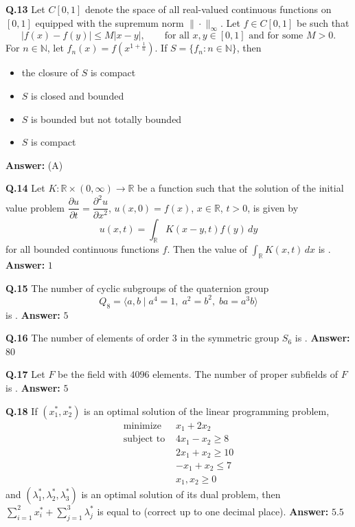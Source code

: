 \documentclass[11pt,a4paper]{article}
\newcommand{\optslistA}[4]{%
  \begin{itemize}
    \setlength{\itemsep}{2pt}\setlength{\parskip}{0pt}
    \item[(A)] #1
    \item[(B)] #2
    \item[(C)] #3
    \item[(D)] #4
  \end{itemize}%
}
\newcommand{\ans}[1]{\textbf{Answer:} #1\par\medskip}
\begin{document}
\textbf{Q.13} Let $C[0, 1]$ denote the space of all real-valued continuous functions on $[0, 1]$ equipped with the supremum norm $\|\cdot\|_\infty$. Let $f \in C[0, 1]$ be such that
\[
  |f(x) - f(y)| \le M |x - y|, \qquad \text{for all } x, y \in [0, 1] \text{ and for some } M > 0.
\]
For $n \in \mathbb{N}$, let $f_n(x) = f\!\left(x^{1 + \frac{1}{n}}\right)$. If $S = \{f_n : n \in \mathbb{N}\}$, then
\optslistA{the closure of $S$ is compact}{$S$ is closed and bounded}{$S$ is bounded but not totally bounded}{$S$ is compact}
\ans{(A)}

\textbf{Q.14} Let $K : \mathbb{R} \times (0, \infty) \to \mathbb{R}$ be a function such that the solution of the initial value problem $\dfrac{\partial u}{\partial t} = \dfrac{\partial^2 u}{\partial x^2}$, $u(x, 0) = f(x)$, $x \in \mathbb{R}$, $t > 0$, is given by
\[
  u(x, t) = \int_{\mathbb{R}} K(x - y, t) f(y)\,dy
\]
for all bounded continuous functions $f$. Then the value of $\displaystyle\int_{\mathbb{R}} K(x, t)\,dx$ is \underline{\hspace{2cm}}.
\ans{$1$}

\textbf{Q.15} The number of cyclic subgroups of the quaternion group
\[
  Q_8 = \langle a, b \mid a^4 = 1,\; a^2 = b^2,\; ba = a^3 b \rangle
\]
is \underline{\hspace{2cm}}.
\ans{$5$}

\textbf{Q.16} The number of elements of order $3$ in the symmetric group $S_6$ is \underline{\hspace{2cm}}.
\ans{$80$}

\textbf{Q.17} Let $F$ be the field with $4096$ elements. The number of proper subfields of $F$ is \underline{\hspace{2cm}}.
\ans{$5$}

\textbf{Q.18} If $(x_1^*, x_2^*)$ is an optimal solution of the linear programming problem,
\begin{align*}
  \text{minimize } & x_1 + 2x_2 \\
  \text{subject to } & 4x_1 - x_2 \ge 8 \\
                     & 2x_1 + x_2 \ge 10 \\
                     & -x_1 + x_2 \le 7 \\
                     & x_1, x_2 \ge 0
\end{align*}
and $(\lambda_1^*, \lambda_2^*, \lambda_3^*)$ is an optimal solution of its dual problem, then $\sum_{i=1}^{2} x_i^* + \sum_{j=1}^{3} \lambda_j^*$ is equal to \underline{\hspace{2cm}} (correct up to one decimal place).
\ans{$5.5$}
\end{document}

